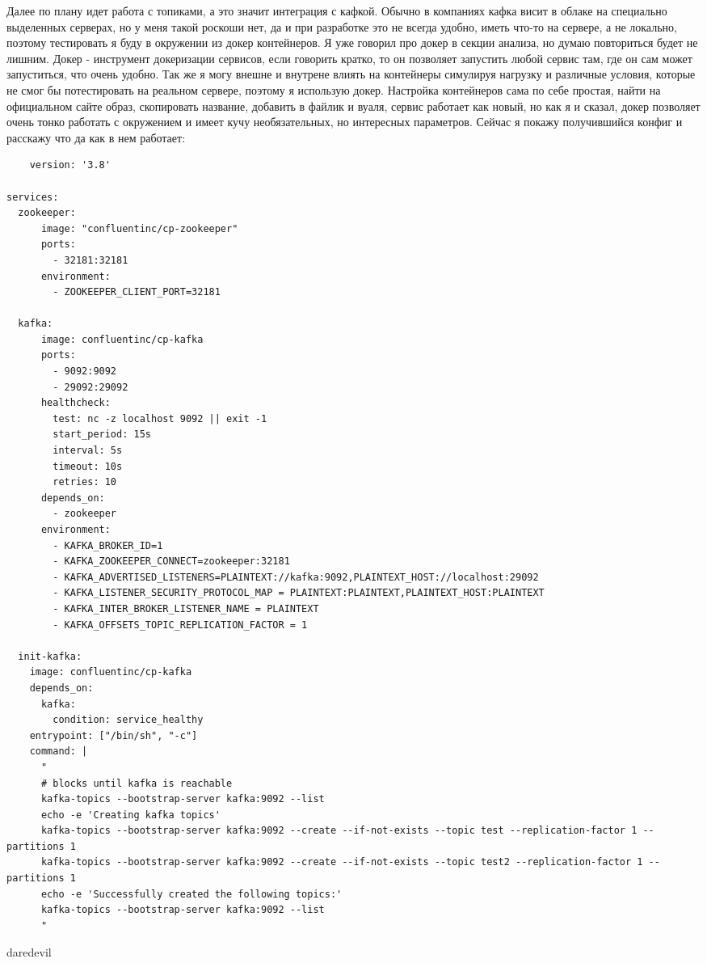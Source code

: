 \documentclass[10pt , a4paper]{report}
\newenvironment{code}{\captionsetup{type=listing}}{}
\begin{document}
Далее по плану идет работа с топиками, а это значит интеграция с кафкой. Обычно в компаниях кафка висит в облаке на специально выделенных серверах, но у меня такой роскоши нет, да и при разработке это не всегда удобно, иметь что-то на сервере, а не локально, поэтому тестировать я буду в окружении из докер контейнеров. Я уже говорил про докер в секции анализа, но думаю повториться будет не лишним. Докер - инструмент докеризации сервисов, если говорить кратко, то он позволяет запустить любой сервис там, где он сам может запуститься, что очень удобно. Так же я могу внешне и внутрене влиять на контейнеры симулируя нагрузку и различные условия, которые не смог бы потестировать на реальном сервере, поэтому я использую докер. Настройка контейнеров сама по себе простая, найти на официальном сайте образ, скопировать название, добавить в файлик и вуаля, сервис работает как новый, но как я и сказал, докер позволяет очень тонко работать с окружением и имеет кучу необязательных, но интересных параметров. Сейчас я покажу получившийся конфиг и расскажу что да как в нем работает:

\begin{code}
  \begin{verbatim}
    version: '3.8'

services:
  zookeeper:
      image: "confluentinc/cp-zookeeper"
      ports:
        - 32181:32181
      environment:
        - ZOOKEEPER_CLIENT_PORT=32181

  kafka:
      image: confluentinc/cp-kafka
      ports:
        - 9092:9092
        - 29092:29092
      healthcheck:
        test: nc -z localhost 9092 || exit -1
        start_period: 15s
        interval: 5s
        timeout: 10s
        retries: 10
      depends_on:
        - zookeeper
      environment:
        - KAFKA_BROKER_ID=1
        - KAFKA_ZOOKEEPER_CONNECT=zookeeper:32181
        - KAFKA_ADVERTISED_LISTENERS=PLAINTEXT://kafka:9092,PLAINTEXT_HOST://localhost:29092
        - KAFKA_LISTENER_SECURITY_PROTOCOL_MAP = PLAINTEXT:PLAINTEXT,PLAINTEXT_HOST:PLAINTEXT
        - KAFKA_INTER_BROKER_LISTENER_NAME = PLAINTEXT
        - KAFKA_OFFSETS_TOPIC_REPLICATION_FACTOR = 1
    
  init-kafka:
    image: confluentinc/cp-kafka
    depends_on:
      kafka:
        condition: service_healthy
    entrypoint: ["/bin/sh", "-c"]
    command: |
      "
      # blocks until kafka is reachable
      kafka-topics --bootstrap-server kafka:9092 --list
      echo -e 'Creating kafka topics'
      kafka-topics --bootstrap-server kafka:9092 --create --if-not-exists --topic test --replication-factor 1 --partitions 1
      kafka-topics --bootstrap-server kafka:9092 --create --if-not-exists --topic test2 --replication-factor 1 --partitions 1
      echo -e 'Successfully created the following topics:'
      kafka-topics --bootstrap-server kafka:9092 --list
      "

  \end{verbatim}
  \caption{daredevil}
\end{code}
\end{document}
